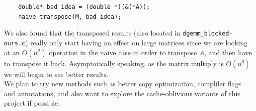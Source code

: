 \documentclass[11pt]{article}
\begin{document}
\begin{lstlisting}
    double* bad_idea = (double *)(&(*A));
    naive_transpose(M, bad_idea);
\end{lstlisting}

\noindent We also found that the transposed results (also located in \texttt{dgemm\_blocked-ours.c}) really only start having an effect on large matrices since we are looking at an $O(n^2)$ operation in the naive case in order to transpose $A$, and then have to transpose it back.  Asymptotically speaking, as the matrix multiply is $O(n^3)$ we will begin to see better results.\\

\noindent We plan to try new methods such as better copy optimization, compliler flags and annotations, and also want to explore the cache-oblivious variants of this project if possible.
\end{document}
